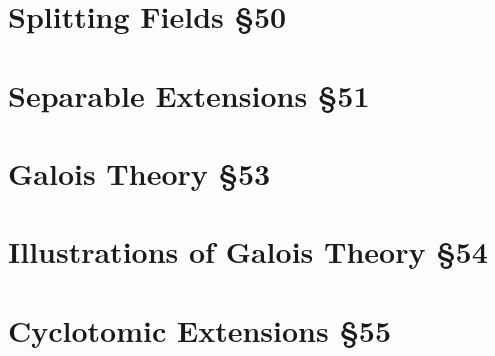 \section{Splitting Fields \S50}

\section{Separable Extensions \S51}
\section{Galois Theory \S53}
\section{Illustrations of Galois Theory \S54}
\section{Cyclotomic Extensions \S55}
